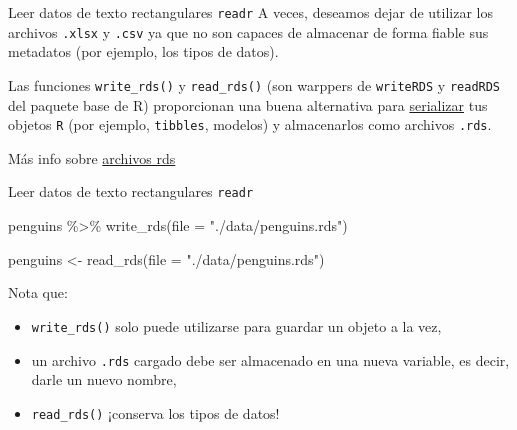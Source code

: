 \documentclass[
  ignorenonframetext,
  aspectratio=169]{beamer}
\newenvironment{Shaded}{\begin{snugshade}}{\end{snugshade}}
\newcommand{\AttributeTok}[1]{\textcolor[rgb]{0.77,0.63,0.00}{#1}}
\newcommand{\FunctionTok}[1]{\textcolor[rgb]{0.00,0.00,0.00}{#1}}
\newcommand{\NormalTok}[1]{#1}
\newcommand{\OtherTok}[1]{\textcolor[rgb]{0.56,0.35,0.01}{#1}}
\newcommand{\SpecialCharTok}[1]{\textcolor[rgb]{0.00,0.00,0.00}{#1}}
\newcommand{\StringTok}[1]{\textcolor[rgb]{0.31,0.60,0.02}{#1}}
\begin{document}
\begin{frame}[fragile]{Leer datos de texto rectangulares \texttt{readr}}
\protect\hypertarget{leer-datos-de-texto-rectangulares-readr-8}{}
A veces, deseamos dejar de utilizar los archivos \texttt{.xlsx} y
\texttt{.csv} ya que no son capaces de almacenar de forma fiable sus
metadatos (por ejemplo, los tipos de datos).

Las funciones \texttt{write\_rds()} y \texttt{read\_rds()} (son warppers
de \texttt{writeRDS} y \texttt{readRDS} del paquete base de R)
proporcionan una buena alternativa para
\href{https://en.wikipedia.org/wiki/Serialization}{serializar} tus
objetos \texttt{R} (por ejemplo, \texttt{tibbles}, modelos) y
almacenarlos como archivos \texttt{.rds}.

Más info sobre
\href{https://mgimond.github.io/ES218/Week02b.html\#Export_to_a_Rds_file}{archivos
rds}
\end{frame}

\begin{frame}[fragile]{Leer datos de texto rectangulares \texttt{readr}}
\protect\hypertarget{leer-datos-de-texto-rectangulares-readr-9}{}
\begin{Shaded}
\begin{Highlighting}[]
\NormalTok{penguins }\SpecialCharTok{\%\textgreater{}\%} 
  \FunctionTok{write\_rds}\NormalTok{(}\AttributeTok{file =} \StringTok{"./data/penguins.rds"}\NormalTok{)}
\end{Highlighting}
\end{Shaded}

\begin{Shaded}
\begin{Highlighting}[]
\NormalTok{penguins }\OtherTok{\textless{}{-}} \FunctionTok{read\_rds}\NormalTok{(}\AttributeTok{file =} \StringTok{"./data/penguins.rds"}\NormalTok{)}
\end{Highlighting}
\end{Shaded}

Nota que:

\begin{itemize}
\item
  \texttt{write\_rds()} solo puede utilizarse para guardar un objeto a
  la vez,
\item
  un archivo \texttt{.rds} cargado debe ser almacenado en una nueva
  variable, es decir, darle un nuevo nombre,
\item
  \texttt{read\_rds()} ¡conserva los tipos de datos!
\end{itemize}
\end{frame}
\end{document}
